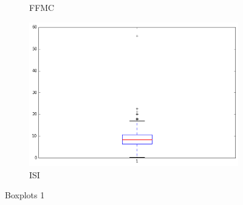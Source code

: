 \begin{figure}[!ht]
\begin{subfigure}[b]{.45\linewidth}
\caption{FFMC}\label{fig:tiger}
\end{subfigure}
\begin{subfigure}[b]{.45\linewidth}
\includegraphics[width=\linewidth]{fig/boxplots/ISI.png}
\caption{ISI}\label{fig:tiger}
\end{subfigure}
\label{fig:boxplot_1}
\caption{Boxplots 1}
\end{figure}

